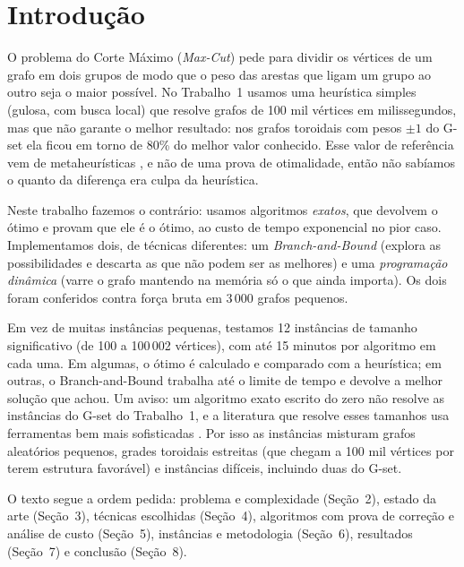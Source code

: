 \section{Introdução}

O problema do Corte Máximo (\emph{Max-Cut}) pede para dividir os vértices de um grafo em dois grupos de modo que o peso das arestas que ligam um grupo ao outro seja o maior possível. No Trabalho~1 usamos uma heurística simples (gulosa, com busca local) que resolve grafos de 100 mil vértices em milissegundos, mas que não garante o melhor resultado: nos grafos toroidais com pesos $\pm1$ do G-set ela ficou em torno de 80\% do melhor valor conhecido. Esse valor de referência vem de metaheurísticas \cite{Benlic and Hao 2013}, e não de uma prova de otimalidade, então não sabíamos o quanto da diferença era culpa da heurística.

Neste trabalho fazemos o contrário: usamos algoritmos \emph{exatos}, que devolvem o ótimo e provam que ele é o ótimo, ao custo de tempo exponencial no pior caso. Implementamos dois, de técnicas diferentes: um \emph{Branch-and-Bound} (explora as possibilidades e descarta as que não podem ser as melhores) e uma \emph{programação dinâmica} (varre o grafo mantendo na memória só o que ainda importa). Os dois foram conferidos contra força bruta em 3\,000 grafos pequenos.

Em vez de muitas instâncias pequenas, testamos 12 instâncias de tamanho significativo (de 100 a 100\,002 vértices), com até 15 minutos por algoritmo em cada uma. Em algumas, o ótimo é calculado e comparado com a heurística; em outras, o Branch-and-Bound trabalha até o limite de tempo e devolve a melhor solução que achou. Um aviso: um algoritmo exato escrito do zero não resolve as instâncias do G-set do Trabalho~1, e a literatura que resolve esses tamanhos usa ferramentas bem mais sofisticadas \cite{Liers et al. 2004, Rendl et al. 2010}. Por isso as instâncias misturam grafos aleatórios pequenos, grades toroidais estreitas (que chegam a 100 mil vértices por terem estrutura favorável) e instâncias difíceis, incluindo duas do G-set.

O texto segue a ordem pedida: problema e complexidade (Seção~2), estado da arte (Seção~3), técnicas escolhidas (Seção~4), algoritmos com prova de correção e análise de custo (Seção~5), instâncias e metodologia (Seção~6), resultados (Seção~7) e conclusão (Seção~8).

